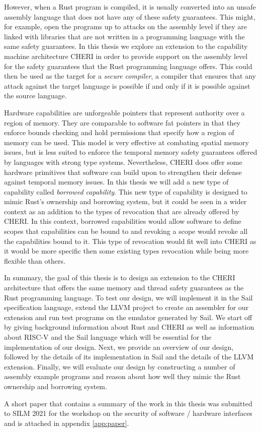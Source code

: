 However, when a Rust program is compiled, it is usually converted into an unsafe assembly language that does not have any of these safety guarantees.
This might, for example, open the programs up to attacks on the assembly level if they are linked with libraries that are not written in a programming language with the same safety guarantees.
In this thesis we explore an extension to the capability machine architecture CHERI in order to provide support on the assembly level for the safety guarantees that the Rust programming language offers.
This could then be used as the target for a \textit{secure compiler}, a compiler that ensures that any attack against the target language is possible if and only if it is possible against the source language.

Hardware capabilities are unforgeable pointers that represent authority over a region of memory.
They are comparable to software fat pointers in that they enforce bounds checking and hold permissions that specify how a region of memory can be used.
This model is very effective at combating spatial memory issues, but is less suited to enforce the temporal memory safety guarantees offered by languages with strong type systems.
Nevertheless, CHERI does offer some hardware primitives that software can build upon to strengthen their defense against temporal memory issues.
In this thesis we will add a new type of capability called \textit{borrowed capability}.
This new type of capability is designed to mimic Rust's ownership and borrowing system, but it could be seen in a wider context as an addition to the types of revocation that are already offered by CHERI.
In this context, borrowed capabilities would allow software to define scopes that capabilities can be bound to and revoking a scope would revoke all the capabilities bound to it.
This type of revocation would fit well into CHERI as it would be more specific then some existing types revocation while being more flexible than others.

In summary, the goal of this thesis is to design an extension to the CHERI architecture that offers the same memory and thread safety guarantees as the Rust programming language.
To test our design, we will implement it in the Sail specification language, extend the LLVM project to create an assembler for our extension and run test programs on the emulator generated by Sail.
We start off by giving background information about Rust and CHERI as well as information about RISC-V and the Sail language which will be essential for the implementation of our design.
Next, we provide an overview of our design, followed by the details of its implementation in Sail and the details of the LLVM extension.
Finally, we will evaluate our design by constructing a number of assembly example programs and reason about how well they mimic the Rust ownership and borrowing system.

A short paper that contains a summary of the work in this thesis was submitted to SILM 2021 for the workshop on the security of software / hardware interfaces and is attached in appendix \ref{app:paper}.

